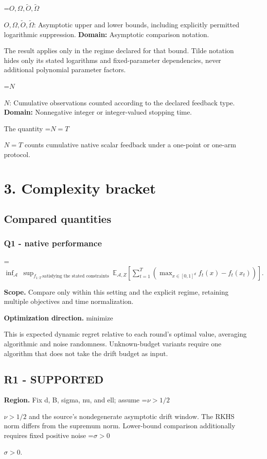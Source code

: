 \documentclass[10pt,a4paper]{article}
\newcommand{\AtlasMath}[1]{\par\begingroup\centering\setbox0=\hbox{$\displaystyle #1$}\ifdim\wd0>1.4\linewidth\typeout{ATLAS WIDE FORMULA: \the\wd0}\fi\ifdim\wd0>\linewidth\resizebox{\linewidth}{!}{\box0}\else\box0\fi\par\endgroup}
\newcommand{\AtlasInlineMath}[1]{\begingroup\setbox0=\hbox{$#1$}\ifdim\wd0>.4\linewidth\endgroup\AtlasMath{#1}\else\endgroup$#1$\fi}
\begin{document}
\AtlasInlineMath{O,\Omega,\widetilde O,\widetilde\Omega}: Asymptotic upper and lower bounds, including explicitly permitted logarithmic suppression. \textbf{Domain:} Asymptotic comparison notation.

The result applies only in the regime declared for that bound. Tilde notation hides only its stated logarithms and fixed-parameter dependencies, never additional polynomial parameter factors.

\AtlasInlineMath{N}: Cumulative observations counted according to the declared feedback type. \textbf{Domain:} Nonnegative integer or integer-valued stopping time.

The quantity \AtlasInlineMath{N=T} counts cumulative native scalar feedback under a one-point or one-arm protocol.

\section{3. Complexity bracket}
\subsection{Compared quantities}
\subsubsection{Q1 - native performance}
\AtlasMath{\inf_{\mathcal A}\ \sup_{f_{1:T}\ \text{satisfying the stated constraints}}\ \mathbb E_{\mathcal A,Z}\!\left[\sum_{t=1}^{T}\left(\max_{x\in[0,1]^d}f_t(x)-f_t(x_t)\right)\right].}
\textbf{Scope.} Compare only within this setting and the explicit regime, retaining multiple objectives and time normalization.

\textbf{Optimization direction.} minimize

This is expected dynamic regret relative to each round's optimal value, averaging algorithmic and noise randomness. Unknown-budget variants require one algorithm that does not take the drift budget as input.

\subsection{R1 - SUPPORTED}
\textbf{Region.} Fix d, B, sigma, nu, and ell; assume \AtlasInlineMath{\nu>1/2} and the source's nondegenerate asymptotic drift window. The RKHS norm differs from the supremum norm. Lower-bound comparison additionally requires fixed positive noise \AtlasInlineMath{\sigma>0}.
\end{document}
